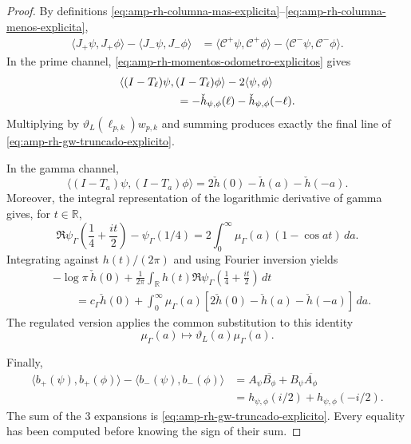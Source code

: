 \begin{proof}
By definitions \eqref{eq:amp-rh-columna-mas-explicita}--\eqref{eq:amp-rh-columna-menos-explicita},
\begin{align}
 \langle J_+\psi,J_+\phi\rangle
 -\langle J_-\psi,J_-\phi\rangle
 &=
 \langle\mathcal C^+\psi,\mathcal C^+\phi\rangle
 -\langle\mathcal C^-\psi,\mathcal C^-\phi\rangle .
 \label{eq:amp-rh-expansion-inicial}
\end{align}
In the prime channel, \eqref{eq:amp-rh-momentos-odometro-explicitos} gives
\begin{align*}
 &\langle(I-T_\ell)\psi,(I-T_\ell)\phi\rangle
 -2\langle\psi,\phi\rangle\\
 &\hspace{18mm}
 =-\check h_{\psi,\phi}(\ell)
  -\check h_{\psi,\phi}(-\ell).
\end{align*}
Multiplying by \(\vartheta_L(\ell_{p,k})w_{p,k}\) and summing produces exactly the final line of \eqref{eq:amp-rh-gw-truncado-explicito}.

In the gamma channel,
\[
 \langle(I-T_a)\psi,(I-T_a)\phi\rangle
 =2\check h(0)-\check h(a)-\check h(-a).
\]
Moreover, the integral representation of the logarithmic derivative of gamma gives, for \(t\in\mathbb R\),
\begin{equation}\label{eq:amp-rh-digamma-longitudes}
 \Re\psi_\Gamma\!\left(\frac14+\frac{it}{2}\right)-\psi_\Gamma(1/4)
 =2\int_0^\infty\mu_\Gamma(a)(1-\cos at)\,da .
\end{equation}
Integrating against \(h(t)/(2\pi)\) and using Fourier inversion yields
\begin{align*}
 &-\log\pi\,\check h(0)
 +\frac1{2\pi}\int_{\mathbb R}h(t)
  \Re\psi_\Gamma\!\left(\frac14+\frac{it}{2}\right)\,dt\\
 &\qquad =
 c_\Gamma\check h(0)
 +\int_0^\infty\mu_\Gamma(a)
  [2\check h(0)-\check h(a)-\check h(-a)]\,da .
\end{align*}
The regulated version applies the common substitution to this identity
\[
 \mu_\Gamma(a)\longmapsto
 \vartheta_L(a)\mu_\Gamma(a).
\]

Finally,
\begin{align*}
 \langle b_+(\psi),b_+(\phi)\rangle
 -\langle b_-(\psi),b_-(\phi)\rangle
 &=
 A_\psi\overline{B_\phi}
 +B_\psi\overline{A_\phi}\\
 &=h_{\psi,\phi}(i/2)+h_{\psi,\phi}(-i/2).
\end{align*}
The sum of the \(3\) expansions is \eqref{eq:amp-rh-gw-truncado-explicito}. Every equality has been computed before knowing the sign of their sum.
\end{proof}

